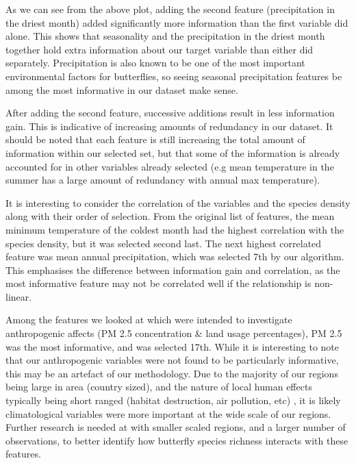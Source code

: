 \documentclass[prl,showpacs,superscriptaddress,twocolumn,longbibliography]{revtex4-1}
\begin{document}
As we can see from the above plot, adding the second feature (precipitation in the driest month) added significantly more information than the first variable did alone. This shows that seasonality and the precipitation in the driest month together hold extra information about our target variable than either did separately. Precipitation is also known to be one of the most important environmental factors for butterflies\cite{rueda-m_environmental_2021}, so seeing seasonal precipitation features be among the most informative in our dataset make sense.

After adding the second feature, successive additions result in less information gain. This is indicative of increasing amounts of redundancy in our dataset. It should be noted that each feature is still increasing the total amount of information within our selected set, but that some of the information is already accounted for in other variables already selected (e.g mean temperature in the summer has a large amount of redundancy with annual max temperature).

It is interesting to consider the correlation of the variables and the species density along with their order of selection. From the original list of features, the mean minimum temperature of the coldest month had the highest correlation with the species density, but it was selected second last. The next highest correlated feature was mean annual precipitation, which was selected 7th by our algorithm. This emphasises the difference between information gain and correlation, as the most informative feature may not be correlated well if the relationship is non-linear.

Among the features we looked at which were intended to investigate anthropogenic affects (PM 2.5 concentration \& land usage percentages), PM 2.5 was the most informative, and was selected 17th. While it is interesting to note that our anthropogenic variables were not found to be particularly informative, this may be an artefact of our methodology. Due to the majority of our regions being large in area (country sized), and the nature of local human effects typically being short ranged (habitat destruction, air pollution, etc) \cite{he_urban_2014}, it is likely climatological variables were more important at the wide scale of our regions. Further research is needed at with smaller scaled regions, and a larger number of observations, to better identify how butterfly species richness interacts with these features. 
\end{document}
